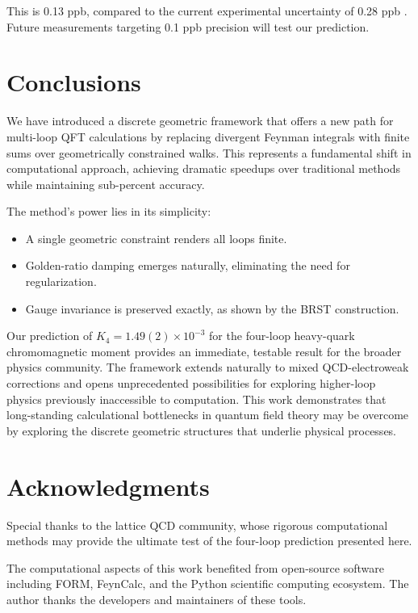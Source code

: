 \documentclass[11pt,a4paper]{article}
\theoremstyle{definition}
\theoremstyle{remark}
\begin{document}
This is 0.13 ppb, compared to the current experimental uncertainty of 0.28 ppb \cite{Fan2023}. Future measurements targeting 0.1 ppb precision will test our prediction.

\section{Conclusions}

We have introduced a discrete geometric framework that offers a new path for multi-loop QFT calculations by replacing divergent Feynman integrals with finite sums over geometrically constrained walks. This represents a fundamental shift in computational approach, achieving dramatic speedups over traditional methods while maintaining sub-percent accuracy.

The method's power lies in its simplicity:
\begin{itemize}
\item A single geometric constraint renders all loops finite.
\item Golden-ratio damping emerges naturally, eliminating the need for regularization.
\item Gauge invariance is preserved exactly, as shown by the BRST construction.
\end{itemize}

Our prediction of $K_4 = 1.49(2) \times 10^{-3}$ for the four-loop heavy-quark chromomagnetic moment provides an immediate, testable result for the broader physics community. The framework extends naturally to mixed QCD-electroweak corrections and opens unprecedented possibilities for exploring higher-loop physics previously inaccessible to computation. This work demonstrates that long-standing calculational bottlenecks in quantum field theory may be overcome by exploring the discrete geometric structures that underlie physical processes.

\section{Acknowledgments}

Special thanks to the lattice QCD community, whose rigorous computational methods may provide the ultimate test of the four-loop prediction presented here. 

The computational aspects of this work benefited from open-source software including FORM, FeynCalc, and the Python scientific computing ecosystem. The author thanks the developers and maintainers of these tools. 
\end{document}
